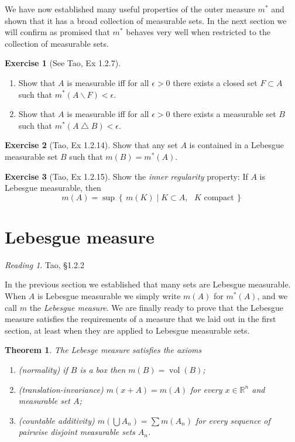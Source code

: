 \documentclass[11pt,oneside]{amsbook}
\newcommand{\set}[1]{\left\{\,#1\,\right\}}
\renewcommand{\setminus}{\smallsetminus}
\renewcommand{\triangle}{\bigtriangleup}
\newcommand{\RR}{{\mathbb R}}
\DeclareMathOperator{\vol}{vol}
\theoremstyle{definition}
\newtheorem{exerc}{Exercise}[section]
\theoremstyle{plain}
\newtheorem{thm}{Theorem}[section]
\theoremstyle{definition}
\theoremstyle{remark}
\newtheorem*{reading}{Reading}
\numberwithin{equation}{section}
\numberwithin{figure}{section}
\begin{document}
We have now established many useful properties of the outer measure $m^*$ and shown that it has a broad collection of measurable sets. In the next section we will confirm as promised that $m^*$ behaves very well when restricted to the collection of measurable sets.

\begin{exerc}[See Tao, Ex 1.2.7]
  \begin{enumerate}
    \item Show that $A$ is measurable iff for all $\epsilon>0$ there exists a closed set $F\subset A$ such that $m^*(A\setminus F)<\epsilon$.
    \item Show that $A$ is measurable iff for all $\epsilon>0$ there exists a measurable set $B$ such that $m^*(A\triangle B)<\epsilon$.
  \end{enumerate}
\end{exerc}

\begin{exerc}[Tao, Ex 1.2.14]
  Show that any set $A$ is contained in a Lebesgue measurable set $B$ such that $m(B)=m^*(A)$.
\end{exerc}

\begin{exerc}[Tao, Ex 1.2.15]
  Show the \emph{inner regularity} property: If $A$ is Lebesgue measurable, then
  \[m(A)=\sup\set{m(K)\mid K\subset A,\text{ $K$ compact}}
  \]
\end{exerc}

\newpage
\section{Lebesgue measure}

\begin{reading}
  Tao, \S 1.2.2
\end{reading}

In the previous section we established that many sets are Lebesgue measurable. When $A$ is Lebesgue measurable we simply write $m(A)$ for $m^*(A)$, and we call $m$ the \emph{Lebesgue measure}. We are finally ready to prove that the Lebesgue measure satisfies the requirements of a measure that we laid out in the first section, at least when they are applied to Lebesgue measurable sets.

\begin{thm}
  The Lebesge measure satisfies the axioms
  \begin{enumerate}
  \item (normality) if $B$ is a box then $m(B)=\vol(B)$;
  \item (translation-invariance) $m(x+A)=m(A)$ for every $x\in\RR^n$ and measurable set $A$;
  \item (countable additivity) $m(\bigcup A_n)=\sum m(A_n)$ for every sequence of pairwise disjoint measurable sets $A_n$.
  \end{enumerate}
\end{thm}
\end{document}
